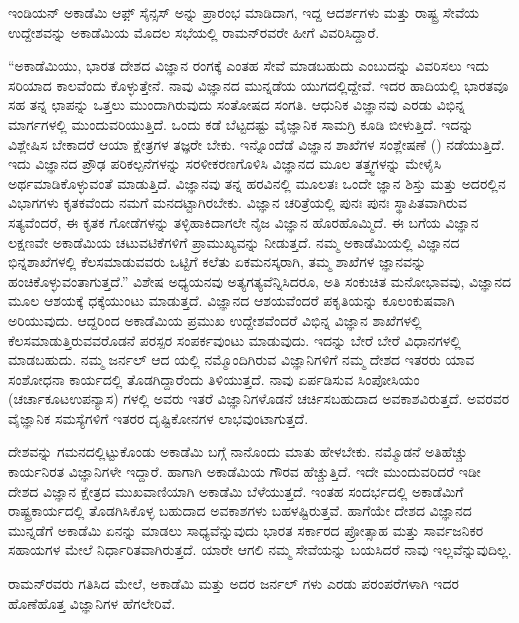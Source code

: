 ಇಂಡಿಯನ್ ಅಕಾಡೆಮಿ ಆಫ಼್ ಸೈನ್ಸಸ್ ಅನ್ನು ಪ್ರಾರಂಭ ಮಾಡಿದಾಗ, ಇದ್ದ ಆದರ್ಶಗಳು ಮತ್ತು ರಾಷ್ಟ್ರ ಸೇವೆಯ ಉದ್ದೇಶವನ್ನು ಅಕಾಡೆಮಿಯ ಮೊದಲ ಸಭೆಯಲ್ಲಿ ರಾಮನ್‍ರವರೇ ಹೀಗೆ ವಿವರಿಸಿದ್ದಾರೆ.

“ಅಕಾಡೆಮಿಯು, ಭಾರತ ದೇಶದ ವಿಜ್ಞಾನ ರಂಗಕ್ಕೆ ಎಂತಹ ಸೇವೆ ಮಾಡಬಹುದು ಎಂಬುದನ್ನು ವಿವರಿಸಲು ಇದು ಸರಿಯಾದ ಕಾಲವೆಂದು ಕೊಳ್ಳುತ್ತೇನೆ. ನಾವು ವಿಜ್ಞಾನದ ಮುನ್ನಡೆಯ ಯುಗದಲ್ಲಿದ್ದೇವೆ. ಇದರ ಹಾದಿಯಲ್ಲಿ ಭಾರತವೂ ಸಹ ತನ್ನ ಛಾಪನ್ನು ಒತ್ತಲು ಮುಂದಾಗಿರುವುದು ಸಂತೋಷದ ಸಂಗತಿ. ಆಧುನಿಕ ವಿಜ್ಞಾನವು ಎರಡು ವಿಭಿನ್ನ ಮಾರ್ಗಗಳಲ್ಲಿ ಮುಂದುವರಿಯುತ್ತಿದೆ. ಒಂದು ಕಡೆ ಬೆಟ್ಟದಷ್ಟು ವೈಜ್ಞಾನಿಕ ಸಾಮಗ್ರಿ ಕೂಡಿ ಬೀಳುತ್ತಿದೆ. ಇದನ್ನು ವಿಶ್ಲೇಷಿಸ ಬೇಕಾದರೆ ಆಯಾ ಕ್ಷೇತ್ರಗಳ ತಜ್ಞರೇ ಬೇಕು. ಇನ್ನೊಂದೆಡೆ ವಿಜ್ಞಾನ ಶಾಖೆಗಳ ಸಂಶ್ಲೇಷಣೆ () ನಡೆಯುತ್ತಿದೆ. ಇದು ವಿಜ್ಞಾನದ ಪ್ರೌಢ ಪರಿಕಲ್ಪನೆಗಳನ್ನು ಸರಳೀಕರಣಗೊಳಿಸಿ ವಿಜ್ಞಾನದ ಮೂಲ ತತ್ತ್ವಗಳನ್ನು ಮೇಳೈಸಿ ಅರ್ಥಮಾಡಿಕೊಳ್ಳುವಂತೆ ಮಾಡುತ್ತಿದೆ. ವಿಜ್ಞಾನವು ತನ್ನ ಹರವಿನಲ್ಲಿ ಮೂಲತಃ ಒಂದೇ ಜ್ಞಾನ ಶಿಸ್ತು ಮತ್ತು ಅದರಲ್ಲಿನ ವಿಭಾಗಗಳು ಕೃತಕವೆಂದು ನಮಗೆ ಮನದಟ್ಟಾಗಿರಬೇಕು. ವಿಜ್ಞಾನ ಚರಿತ್ರೆಯಲ್ಲಿ ಪುನಃ ಪುನಃ ಸ್ಥಾಪಿತವಾಗಿರುವ ಸತ್ಯವೆಂದರೆ, ಈ ಕೃತಕ ಗೋಡೆಗಳನ್ನು ತಳ್ಳಿಹಾಕಿದಾಗಲೇ ನೈಜ ವಿಜ್ಞಾನ ಹೊರಹೊಮ್ಮಿದೆ. ಈ ಬಗೆಯ ವಿಜ್ಞಾನ ಲಕ್ಷಣವೇ ಅಕಾಡೆಮಿಯ ಚಟುವಟಿಕೆಗಳಿಗೆ ಪ್ರಾಮುಖ್ಯವನ್ನು ನೀಡುತ್ತದೆ. ನಮ್ಮ ಅಕಾಡೆಮಿಯಲ್ಲಿ ವಿಜ್ಞಾನದ ಭಿನ್ನಶಾಖೆಗಳಲ್ಲಿ ಕೆಲಸಮಾಡುವವರು ಒಟ್ಟಿಗೆ ಕಲೆತು ಏಕಮನಸ್ಕರಾಗಿ, ತಮ್ಮ ಶಾಖೆಗಳ ಜ್ಞಾನವನ್ನು ಹಂಚಿಕೊಳ್ಳುವಂತಾ\-ಗುತ್ತದೆ.” ವಿಶೇಷ ಅಧ್ಯಯನವು ಅತ್ಯಗತ್ಯವೆನ್ನಿಸಿದರೂ, ಅತಿ ಸಂಕುಚಿತ ಮನೋಭಾವವು, ವಿಜ್ಞಾನದ ಮೂಲ ಆಶಯಕ್ಕೆ ಧಕ್ಕೆಯುಂಟು ಮಾಡುತ್ತದೆ. ವಿಜ್ಞಾನದ ಆಶಯವೆಂದರೆ ಪಕೃತಿಯನ್ನು ಕೂಲಂಕುಷವಾಗಿ ಅರಿಯುವುದು. ಆದ್ದರಿಂದ ಅಕಾಡೆಮಿಯ ಪ್ರಮುಖ ಉದ್ದೇಶವೆಂದರೆ ವಿಭಿನ್ನ ವಿಜ್ಞಾನ ಶಾಖೆಗಳಲ್ಲಿ ಕೆಲಸಮಾಡುತ್ತಿರುವವರೊಡನೆ ಪರಸ್ಪರ ಸಂಪರ್ಕವುಂಟು ಮಾಡುವುದು. ಇದನ್ನು ಬೇರೆ ಬೇರೆ ವಿಧಾನಗಳಲ್ಲಿ ಮಾಡಬಹುದು. ನಮ್ಮ ಜರ್ನಲ್ ಆದ \textit{} ಯಲ್ಲಿ ನಮ್ಮೊಂದಿಗಿರುವ ವಿಜ್ಞಾನಿಗಳಿಗೆ ನಮ್ಮ ದೇಶದ ಇತರರು ಯಾವ ಸಂಶೋಧನಾ ಕಾರ್ಯದಲ್ಲಿ ತೊಡಗಿದ್ದಾರೆಂದು ತಿಳಿಯುತ್ತದೆ. ನಾವು ಏರ್ಪಡಿಸುವ ಸಿಂಪೋಸಿಯಂ (ಚರ್ಚಾಕೂಟ\enginline{--}ಉಪನ್ಯಾಸ) ಗಳಲ್ಲಿ ಅವರು ಇತರೆ ವಿಜ್ಞಾನಿಗಳೊಡನೆ ಚರ್ಚಿಸಬಹುದಾದ ಅವಕಾಶವಿರುತ್ತದೆ. ಅವರವರ ವೈಜ್ಞಾನಿಕ ಸಮಸ್ಯೆಗಳಿಗೆ ಇತರರ ದೃಷ್ಟಿಕೋನಗಳ ಲಾಭವುಂಟಾಗುತ್ತದೆ.

ದೇಶವನ್ನು ಗಮನದಲ್ಲಿಟ್ಟುಕೊಂಡು ಅಕಾಡೆಮಿ ಬಗ್ಗೆ ನಾನೊಂದು ಮಾತು ಹೇಳಬೇಕು. ನಮ್ಮೊಡನೆ ಅತಿಹೆಚ್ಚು ಕಾರ್ಯನಿರತ ವಿಜ್ಞಾನಿಗಳೇ ಇದ್ದಾರೆ. ಹಾಗಾಗಿ ಅಕಾಡೆಮಿಯ ಗೌರವ ಹೆಚ್ಚುತ್ತಿದೆ. ಇದೇ ಮುಂದುವರಿದರೆ ಇಡೀ ದೇಶದ ವಿಜ್ಞಾನ ಕ್ಷೇತ್ರದ ಮುಖವಾಣಿಯಾಗಿ ಅಕಾಡೆಮಿ ಬೆಳೆಯುತ್ತದೆ. ಇಂತಹ ಸಂದರ್ಭದಲ್ಲಿ ಅಕಾಡೆಮಿಗೆ ರಾಷ್ಟ್ರಕಾರ್ಯದಲ್ಲಿ ತೊಡಗಿಸಿಕೊಳ್ಳ ಬಹುದಾದ ಅವಕಾಶಗಳು ಬಹಳಷ್ಟಿರುತ್ತವೆ. ಹಾಗೆಯೇ ದೇಶದ ವಿಜ್ಞಾನದ ಮುನ್ನಡೆಗೆ ಅಕಾಡೆಮಿ ಏನನ್ನು ಮಾಡಲು ಸಾಧ್ಯವೆನ್ನುವುದು ಭಾರತ ಸರ್ಕಾರದ ಪ್ರೋತ್ಸಾಹ ಮತ್ತು ಸಾರ್ವಜನಿಕರ ಸಹಾಯಗಳ ಮೇಲೆ ನಿರ್ಧಾರಿತವಾಗಿರುತ್ತದೆ. ಯಾರೇ ಆಗಲಿ ನಮ್ಮ ಸೇವೆಯನ್ನು ಬಯಸಿದರೆ ನಾವು ಇಲ್ಲವೆನ್ನುವುದಿಲ್ಲ.

ರಾಮನ್‍ರವರು ಗತಿಸಿದ ಮೇಲೆ, ಅಕಾಡೆಮಿ ಮತ್ತು ಅದರ ಜರ್ನಲ್  ಗಳು ಎರಡು ಪರಂಪರೆಗಳಾಗಿ ಇದರ ಹೊಣೆಹೊತ್ತ ವಿಜ್ಞಾನಿಗಳ ಹೆಗಲೇರಿವೆ.


